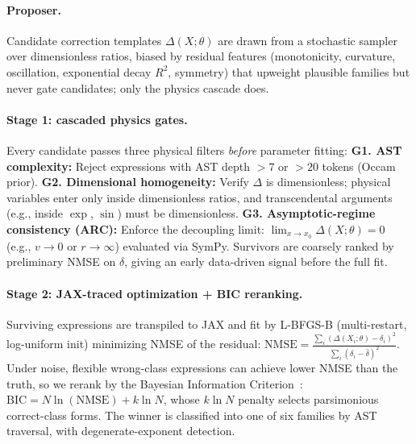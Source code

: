 \documentclass{article}
\begin{document}
\paragraph{Proposer.}
Candidate correction templates $\Delta(X;\theta)$ are drawn from a stochastic sampler over dimensionless ratios, biased by residual features (monotonicity, curvature, oscillation, exponential decay $R^2$, symmetry) that upweight plausible families but never gate candidates; only the physics cascade does.

\paragraph{Stage 1: cascaded physics gates.}
Every candidate passes three physical filters \emph{before} parameter fitting:
\textbf{G1. AST complexity:} Reject expressions with AST depth $>7$ or $>20$ tokens (Occam prior).
\textbf{G2. Dimensional homogeneity:} Verify $\Delta$ is dimensionless; physical variables enter only inside dimensionless ratios, and transcendental arguments (e.g., inside $\exp$, $\sin$) must be dimensionless.
\textbf{G3. Asymptotic-regime consistency (ARC):} Enforce the decoupling limit: $\lim_{x\to x_0}\Delta(X;\theta)=0$ (e.g., $v\to 0$ or $r\to \infty$) evaluated via SymPy.
Survivors are coarsely ranked by preliminary NMSE on $\delta$, giving an early data-driven signal before the full fit.

\paragraph{Stage 2: JAX-traced optimization + BIC reranking.}
Surviving expressions are transpiled to JAX and fit by L-BFGS-B (multi-restart, log-uniform init) minimizing NMSE of the residual:
$\text{NMSE}=\tfrac{\sum_i(\Delta(X_i;\theta)-\delta_i)^2}{\sum_i(\delta_i-\bar\delta)^2}$.
Under noise, flexible wrong-class expressions can achieve lower NMSE than the truth, so we rerank by the Bayesian Information Criterion~\cite{schwarz1978bic,rissanen1978mdl}: $\text{BIC}=N\ln(\text{NMSE})+k\ln N$, whose $k\ln N$ penalty selects parsimonious correct-class forms. The winner is classified into one of six families by AST traversal, with degenerate-exponent detection.
\end{document}
